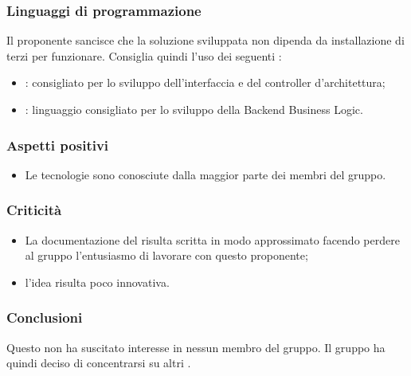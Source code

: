 \documentclass[]{article}
\begin{document}
            \subsubsection{Linguaggi di programmazione}
            Il proponente sancisce che la soluzione sviluppata non dipenda da installazione di  terzi per funzionare.
            Consiglia quindi l'uso dei seguenti :
            \begin{itemize}
                \item {}:  consigliato per lo sviluppo dell'interfaccia e del controller d'architettura;
                \item {}: linguaggio consigliato per lo sviluppo della Backend Business Logic.
            \end{itemize}


            \subsubsection{Aspetti positivi}
            \begin{itemize}
                \item Le tecnologie sono conosciute dalla maggior parte dei membri del gruppo.
            \end{itemize}

            \subsubsection{Criticità}
            \begin{itemize}
                \item La documentazione del  risulta scritta in modo approssimato facendo perdere al gruppo l'entusiasmo di lavorare con questo proponente;
                \item l'idea risulta poco innovativa.
            \end{itemize}

            \subsubsection{Conclusioni}
            Questo  non ha suscitato interesse in nessun membro del gruppo. Il gruppo ha quindi deciso di concentrarsi su altri .
\end{document}

